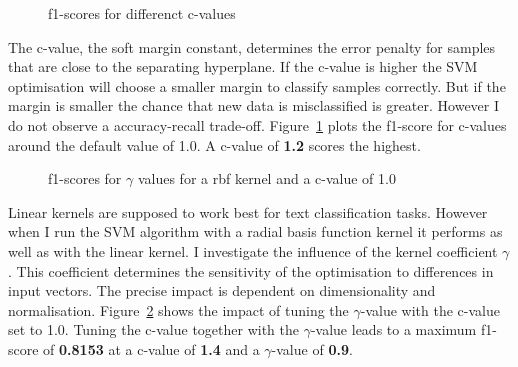 \documentclass[11pt]{article}
\begin{document}
\begin{figure}
  \caption{f1-scores for differenct c-values}
  \label{fig:c-val}
\end{figure}

The c-value, the soft margin constant, determines the error penalty for samples that are close to the separating hyperplane. If the c-value is higher the SVM optimisation will choose a smaller margin to classify samples correctly. But if the margin is smaller the chance that new data is misclassified is greater. However I do not observe a accuracy-recall trade-off. Figure~\ref{fig:c-val} plots the f1-score for c-values around the default value of 1.0. A c-value of \textbf{1.2} scores the highest.

\begin{figure}
  \caption{f1-scores for $\gamma$ values for a rbf kernel and a c-value of 1.0}
  \label{fig:gamma}
\end{figure}

Linear kernels are supposed to work best for text classification tasks. However when I run the SVM algorithm with a radial basis function kernel it performs as well as with the linear kernel. I investigate the influence of the kernel coefficient $\gamma$. This coefficient determines the sensitivity of the optimisation to differences in input vectors. The precise impact is dependent on dimensionality and normalisation. Figure~\ref{fig:gamma} shows the impact of tuning the $\gamma$-value with the c-value set to 1.0. Tuning the c-value together with the $\gamma$-value leads to a maximum f1-score of \textbf{0.8153} at a c-value of \textbf{1.4} and a $\gamma$-value of \textbf{0.9}.
\end{document}
